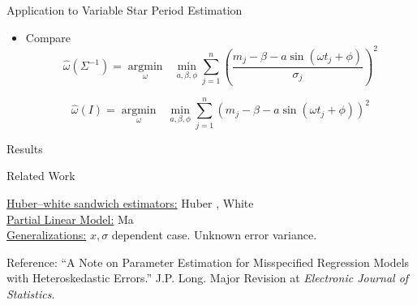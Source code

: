 \documentclass[12pt]{beamer}
\newcommand{\argmin}[1]{\underset{#1}{\operatorname{argmin}}\text{ }}
\begin{document}
\begin{frame}{Application to Variable Star Period Estimation}
\begin{itemize}


  
\item Compare
  \begin{equation*}
    \widehat{\omega}(\Sigma^{-1}) = \argmin{\omega} \min_{a,\beta,\phi} \sum_{j=1}^{n} \left(\frac{m_{j} - \beta - a\sin(\omega t_{j} + \phi)}{\sigma_{j}}\right)^2
  \end{equation*}

  \begin{equation*}
    \widehat{\omega}(I) = \argmin{\omega} \min_{a,\beta,\phi} \sum_{j=1}^{n} \left(m_{j} - \beta - a\sin(\omega t_{j} + \phi)\right)^2
  \end{equation*}

  
  
  
\end{itemize}
\end{frame}


\begin{frame}{Results}


\end{frame}


\begin{frame}{Related Work}


\underline{Huber--white sandwich estimators:} Huber \cite{huber1967behavior}, White \cite{white1980using,white1981consequences}\\

\underline{Partial Linear Model:} Ma \cite{ma2006efficient,ma2013doubly}\\



\underline{Generalizations:} $x, \sigma$ dependent case. Unknown error variance.\\

\vspace{1in}

\footnotesize{Reference: ``A Note on Parameter Estimation for Misspecified Regression Models with Heteroskedastic Errors.'' J.P. Long. Major Revision at \textit{Electronic Journal of Statistics}.}
\end{frame}
\end{document}
